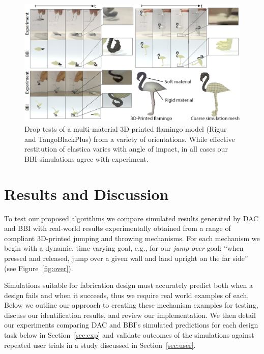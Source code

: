 \begin{figure}
	\centering
	\includegraphics[width=\columnwidth]{images/FlamingoDrop.png}	
	\caption{Drop tests of a multi-material 3D-printed flamingo model (Rigur and TangoBlackPlus) from a variety of orientations. While effective restitution of elastica varies with angle of impact, in all cases our BBI simulations agree with experiment.}
	\label{fig:flamingo_contact}
	\vspace{-10px}
\end{figure}
\section{Results and Discussion}
\label{sec:results}

To test our proposed algorithms we compare simulated results generated by DAC and BBI with real-world results experimentally obtained from a range of compliant 3D-printed jumping and throwing mechanisms.
For each mechanism we begin with a dynamic, time-varying goal, e.g., for our \emph{jump-over} goal: ``when pressed and released, jump over a given wall and land upright on the far side'' (see Figure~\ref{fig:over}).

Simulations suitable for fabrication design must accurately predict both when a design fails and when it succeeds, thus we require real world examples of each. Below we outline our approach to creating these mechanism examples for testing, discuss our identification results, and review our implementation. We then detail our experiments comparing DAC and BBI's simulated predictions for each design task below in Section~\ref{sec:exp} and validate outcomes of the simulations against repeated user trials in a study discussed in Section~\ref{sec:user}.

